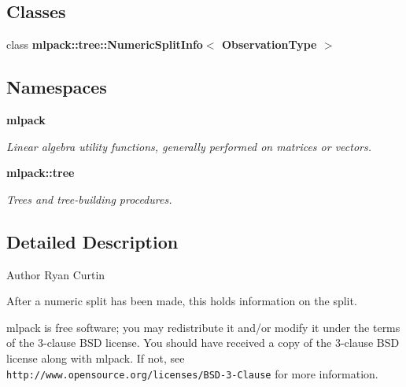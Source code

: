 \subsection*{Classes}
\begin{DoxyCompactItemize}
\item 
class {\bf mlpack\+::tree\+::\+Numeric\+Split\+Info$<$ Observation\+Type $>$}
\end{DoxyCompactItemize}
\subsection*{Namespaces}
\begin{DoxyCompactItemize}
\item 
 {\bf mlpack}
\begin{DoxyCompactList}\small\item\em Linear algebra utility functions, generally performed on matrices or vectors. \end{DoxyCompactList}\item 
 {\bf mlpack\+::tree}
\begin{DoxyCompactList}\small\item\em Trees and tree-\/building procedures. \end{DoxyCompactList}\end{DoxyCompactItemize}


\subsection{Detailed Description}
\begin{DoxyAuthor}{Author}
Ryan Curtin
\end{DoxyAuthor}
After a numeric split has been made, this holds information on the split.

mlpack is free software; you may redistribute it and/or modify it under the terms of the 3-\/clause B\+SD license. You should have received a copy of the 3-\/clause B\+SD license along with mlpack. If not, see {\tt http\+://www.\+opensource.\+org/licenses/\+B\+S\+D-\/3-\/\+Clause} for more information. 